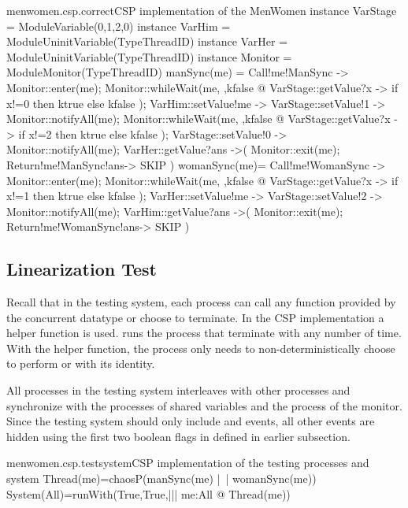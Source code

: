 \documentclass{article}
\begin{document}
\begin{cspfloat}{menwomen.csp.correct}{CSP implementation of the MenWomen}
instance VarStage = ModuleVariable({0,1,2},0) 
instance VarHim = ModuleUninitVariable(TypeThreadID)
instance VarHer = ModuleUninitVariable(TypeThreadID)
instance Monitor = ModuleMonitor(TypeThreadID)
manSync(me) = 
  Call!me!ManSync ->
  Monitor::enter(me);
    Monitor::whileWait(me, \ktrue,kfalse @
      VarStage::getValue?x ->
      if x!=0 then ktrue else kfalse
    );
    VarHim::setValue!me ->
    VarStage::setValue!1 ->
    Monitor::notifyAll(me);
    Monitor::whileWait(me, \ktrue,kfalse @
      VarStage::getValue?x ->
      if x!=2 then ktrue else kfalse
    );
    VarStage::setValue!0 ->
    Monitor::notifyAll(me);
    VarHer::getValue?ans ->(
  Monitor::exit(me);
  Return!me!ManSync!ans->
  SKIP
  )
womanSync(me)=
  Call!me!WomanSync ->
  Monitor::enter(me);
    Monitor::whileWait(me, \ktrue,kfalse @
      VarStage::getValue?x ->
      if x!=1 then ktrue else kfalse
    );
    VarHer::setValue!me ->
    VarStage::setValue!2 ->
    Monitor::notifyAll(me);
    VarHim::getValue?ans ->(
  Monitor::exit(me);
  Return!me!WomanSync!ans->
  SKIP
  )
\end{cspfloat}


\subsection{Linearization Test}
Recall that in the testing system, each process can call any function provided by the concurrent datatype or choose to terminate. In the CSP implementation a helper function is used.  runs the process  that terminate with  any number of time. With the helper function, the process  only needs to non-deterministically choose to perform  or  with its identity.

All processes in the testing system interleaves with other processes and synchronize with the processes of shared variables and the process of the monitor. Since the testing system should only include  and  events, all other events are hidden using the first two boolean flags in  defined in earlier subsection. 
\begin{cspinline}{menwomen.csp.testsystem}{CSP implementation of the testing processes and system}
Thread(me)=chaosP(manSync(me) |~| womanSync(me))
System(All)=runWith(True,True,||| me:All @ Thread(me))
\end{cspinline}
\end{document}
